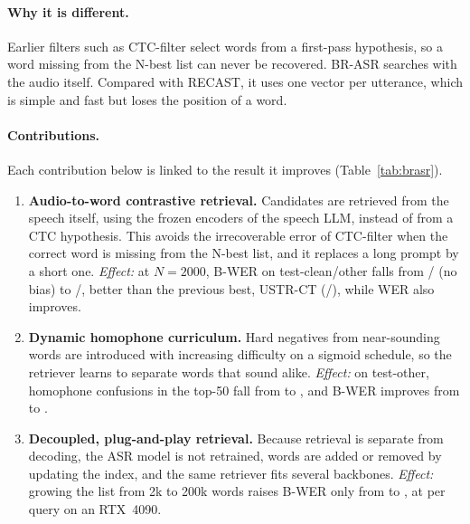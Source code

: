 \paragraph{Why it is different.} Earlier filters such as CTC-filter select words from a first-pass hypothesis, so a word missing from the N-best list can never be recovered.
BR-ASR searches with the audio itself. Compared with RECAST, it uses one vector per utterance, which is simple and fast but loses the position of a word.

\paragraph{Contributions.} Each contribution below is linked to the result it improves (Table~\ref{tab:brasr}).
\begin{enumerate}
  \item \textbf{Audio-to-word contrastive retrieval.} Candidates are retrieved from the speech itself, using the frozen encoders of the speech LLM, instead of from a CTC hypothesis.
    This avoids the irrecoverable error of CTC-filter when the correct word is missing from the N-best list, and it replaces a long prompt by a short one.
    \emph{Effect:} at $N{=}2000$, B-WER on test-clean/other falls from / (no bias) to /,
    better than the previous best, USTR-CT (/), while WER also improves.
  \item \textbf{Dynamic homophone curriculum.} Hard negatives from near-sounding words are introduced with increasing difficulty on a sigmoid schedule, so the retriever learns to separate words that sound alike.
    \emph{Effect:} on test-other, homophone confusions in the top-50 fall from  to , and B-WER improves from  to .
  \item \textbf{Decoupled, plug-and-play retrieval.} Because retrieval is separate from decoding, the ASR model is not retrained, words are added or removed by updating the index,
    and the same retriever fits several backbones.
    \emph{Effect:} growing the list from 2k to 200k words raises B-WER only from  to , at  per query on an RTX~4090.
\end{enumerate}

